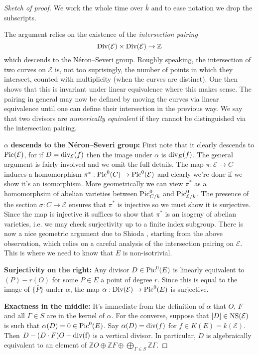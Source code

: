 \documentclass[12pt]{amsart}
\numberwithin{equation}{section}
\theoremstyle{remark}
\theoremstyle{definition}
\theoremstyle{definition}
\theoremstyle{definition}
\theoremstyle{definition}
\theoremstyle{definition}
\theoremstyle{definition}
\theoremstyle{definition}
\begin{document}
\begin{proof}[Sketch of proof]
We work the whole time over $\bar{k}$ and to ease notation we drop the subscripts.
 
The argument relies on the existence of the \textit{intersection pairing} 
\[\textup{Div}(\mathcal{E})\times \textup{Div}(\mathcal{E})\rightarrow \mathbb{Z}\]
which descends to the N\'{e}ron--Severi group. Roughly speaking, the intersection of two curves on $\mathcal{E}$ is, not too suprisingly, the number of points in which they intersect, counted with multiplicity (when the curves are distinct). One then shows that this is invariant under linear equivalence where this makes sense. The pairing in general may now be defined by moving the curves via linear equivalence until one can define their intersection in the previous way. We say that two divisors are \textit{numerically equivalent} if they cannot be distinguished via the intersection pairing. 

$\alpha$ \textbf{descends to the N\'{e}ron--Severi group:} First note that it clearly descends to $\textup{Pic}(\mathcal{E})$, for if $D=\textup{div}_{\mathcal{E}}(f)$ then the image under $\alpha$ is $\textup{div}_E(f)$. The general argument is fairly involved and we omit the full details.  The map $\pi:\mathcal{E}\rightarrow C$ induces a homomorphism $\pi^*:\textup{Pic}^0(C)\rightarrow \textup{Pic}^0(\mathcal{E})$ and clearly we're done if we show it's an isomorphism. More geometrically we can view $\pi^*$ as a homomorphsim of abelian varieties between $\textup{Pic}^0_{C/k}$ and $\textup{Pic}^0_{\mathcal{E}/k}$. The presence of the section $\sigma:C\rightarrow \mathcal{E}$ ensures that $\pi^*$ is injective so we must show it is surjective. Since the map is injective it suffices to show that $\pi^*$ is an isogeny of abelian varieties, i.e. we may check surjectivity up to a finite index subgroup. There is now a nice geometric argument due to Shioda \cite[Theorem 4.1]{MR1081832}, starting from the above observation, which relies on a careful analysis of the intersection pairing on $\mathcal{E}$. This is where we need to know that $E$ is non-isotrivial. 

\textbf{Surjectivity on the right:} Any divisor $D\in \textup{Pic}^0(E)$ is linearly equivalent to $(P)-r(O)$ for some $P\in E$ a point of degree $r$. Since this is equal to the image of $\bar{\{P\}}$ under $\alpha$, the map $\alpha:\textup{Div}(\mathcal{E})\rightarrow \textup{Pic}^0(E)$ is surjective. 

\textbf{Exactness in the middle:} It's immediate from the definition of $\alpha$ that $O$, $F$ and all $\Gamma \in S$ are in the kernel of $\alpha$. For the converse, suppose that $[D]\in \textup{NS}(\mathcal{E})$ is such that $\alpha(D)=0\in \textup{Pic}^0(E)$. Say $\alpha(D)=\textup{div}(f)$ for $f\in K(E)=k(\mathcal{E})$. Then $D-(D\cdot F) O-\textup{div(f)}$ is a vertical divisor. In particular, $D$ is algebraically equivalent to an element of  $ \mathbb{Z}O\oplus \mathbb{Z}F \oplus \bigoplus_{\Gamma \in S}\mathbb{Z}\Gamma$.


\end{proof}
\end{document}
